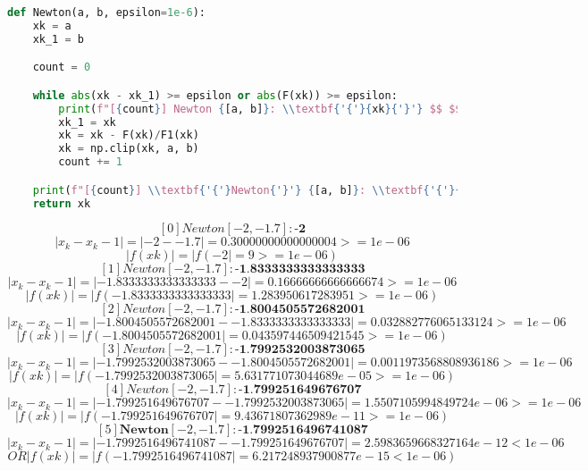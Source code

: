 \documentclass{article}
\begin{document}
    \begin{lstlisting}[language=Python, caption=Newton]
def Newton(a, b, epsilon=1e-6):
    xk = a
    xk_1 = b

    count = 0

    while abs(xk - xk_1) >= epsilon or abs(F(xk)) >= epsilon:
        print(f"[{count}] Newton {[a, b]}: \\textbf{'{'}{xk}{'}'} $$ $$ |x_k - x_k-1| = |{xk} - {xk_1}| = {abs(xk - xk_1)} >= {epsilon} $$ $$ |f(xk)| = |f({xk}| = {abs(F(xk))} >= {epsilon})")
        xk_1 = xk
        xk = xk - F(xk)/F1(xk)
        xk = np.clip(xk, a, b)
        count += 1

    print(f"[{count}] \\textbf{'{'}Newton{'}'} {[a, b]}: \\textbf{'{'}{xk}{'}'} $$ $$ |x_k - x_k-1| = |{xk} - {xk_1}| = {abs(xk - xk_1)} < {epsilon} $$ $$ OR |f(xk)| = |f({xk}| = {abs(F(xk))} < {epsilon})")
    return xk
\end{lstlisting}


    $$ [0] Newton [-2, -1.7]: \textbf{-2} $$ $$ |x_k - x_k-1| = |-2 - -1.7| = 0.30000000000000004 >= 1e-06 $$ $$ |f(xk)| = |f(-2| = 9 >= 1e-06) $$
    $$ [1] Newton [-2, -1.7]: \textbf{-1.8333333333333333} $$ $$ |x_k - x_k-1| = |-1.8333333333333333 - -2| = 0.16666666666666674 >= 1e-06 $$ $$ |f(xk)| = |f(-1.8333333333333333| = 1.283950617283951 >= 1e-06) $$
    $$ [2] Newton [-2, -1.7]: \textbf{-1.8004505572682001} $$ $$ |x_k - x_k-1| = |-1.8004505572682001 - -1.8333333333333333| = 0.032882776065133124 >= 1e-06 $$ $$ |f(xk)| = |f(-1.8004505572682001| = 0.043597446509421545 >= 1e-06) $$
    $$ [3] Newton [-2, -1.7]: \textbf{-1.7992532003873065} $$ $$ |x_k - x_k-1| = |-1.7992532003873065 - -1.8004505572682001| = 0.0011973568808936186 >= 1e-06 $$ $$ |f(xk)| = |f(-1.7992532003873065| = 5.631771073044689e-05 >= 1e-06) $$
    $$ [4] Newton [-2, -1.7]: \textbf{-1.799251649676707} $$ $$ |x_k - x_k-1| = |-1.799251649676707 - -1.7992532003873065| = 1.5507105994849724e-06 >= 1e-06 $$ $$ |f(xk)| = |f(-1.799251649676707| = 9.43671807362989e-11 >= 1e-06) $$
    $$ [5] \textbf{Newton} [-2, -1.7]: \textbf{-1.7992516496741087} $$ $$ |x_k - x_k-1| = |-1.7992516496741087 - -1.799251649676707| = 2.5983659668327164e-12 < 1e-06 $$ $$ OR |f(xk)| = |f(-1.7992516496741087| = 6.217248937900877e-15 < 1e-06) $$
\end{document}
